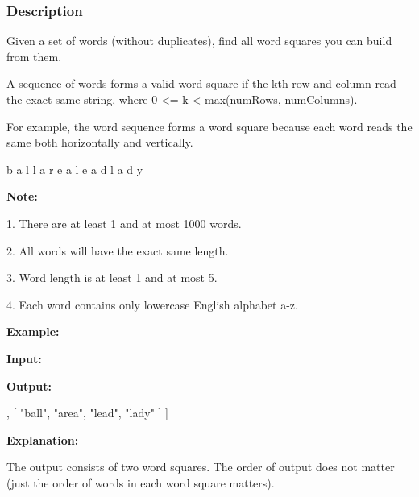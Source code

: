 \subsubsection{Description}
Given a set of words (without duplicates), find all word squares you can build from them.

A sequence of words forms a valid word square if the kth row and column read the exact same string, where 0 <= k < max(numRows, numColumns).

For example, the word sequence  forms a word square because each word reads the same both horizontally and vertically.

\begin{Code}
b a l l
a r e a
l e a d
l a d y
\end{Code}

\textbf{Note:}

1. There are at least 1 and at most 1000 words.

2. All words will have the exact same length.

3. Word length is at least 1 and at most 5.

4. Each word contains only lowercase English alphabet a-z.


\textbf{Example:}

\textbf{Input:}


\textbf{Output:}
\begin{Code}
[
  [ "wall",
    "area",
    "lead",
    "lady"
  ],
  [ "ball",
    "area",
    "lead",
    "lady"
  ]
]
\end{Code}
\textbf{Explanation:}

The output consists of two word squares. The order of output does not matter (just the order of words in each word square matters).
\newpage

